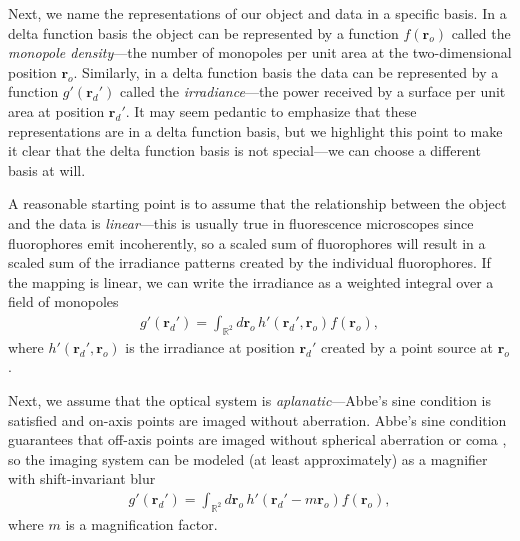 \documentclass[]{osa-article}
\providecommand{\ro}{\mathbf{\mathbf{r}}_o}
\providecommand{\rd}{\mathbf{r}_d}
\providecommand{\mbb}[1]{\mathbb{#1}}
\begin{document}
Next, we name the representations of our object and data in a specific basis. In
a delta function basis the object can be represented by a function $f(\ro)$
called the \textit{monopole density}---the number of monopoles per unit area at
the two-dimensional position $\ro$. Similarly, in a delta function basis the
data can be represented by a function $g'(\rd')$ called the
\textit{irradiance}---the power received by a surface per unit area at position
$\rd'$. It may seem pedantic to emphasize that these representations are in a
delta function basis, but we highlight this point to make it clear that the
delta function basis is not special---we can choose a different basis at will.

A reasonable starting point is to assume that the relationship between the
object and the data is \textit{linear}---this is usually true in fluorescence
microscopes since fluorophores emit incoherently, so a scaled sum of
fluorophores will result in a scaled sum of the irradiance patterns created by
the individual fluorophores. If the mapping is linear, we can write the
irradiance as a weighted integral over a field of monopoles
\begin{align}
g'(\rd') = \int_{\mbb{R}^2}d\ro\, h'(\rd',\ro)f(\ro), \label{eq:fwdmono}
\end{align}
where $h'(\rd{}', \ro{})$ is the irradiance at position $\rd'$ created by a
point source at $\ro$.

Next, we assume that the optical system is \textit{aplanatic}---Abbe's sine
condition is satisfied and on-axis points are imaged without aberration. Abbe's
sine condition guarantees that off-axis points are imaged without spherical
aberration or coma \cite{mansuripur2009}, so the imaging system can be modeled
(at least approximately) as a magnifier with shift-invariant blur
\begin{align}
  g'(\rd') = \int_{\mbb{R}^2}d\ro\, h'(\rd' - m\ro)f(\ro), \label{eq:nonconv}
\end{align}
where $m$ is a magnification factor. 
\end{document}
